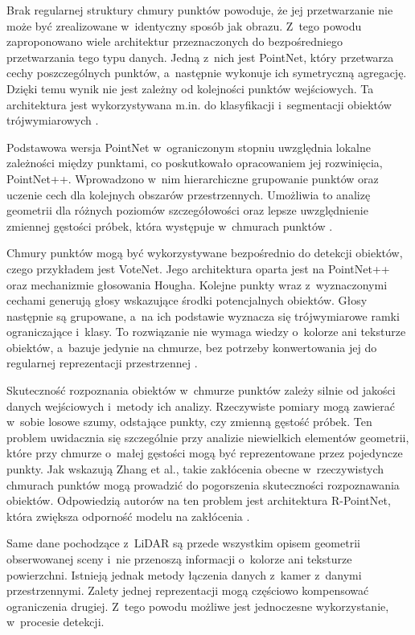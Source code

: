 Brak regularnej struktury chmury punktów powoduje, że jej przetwarzanie nie może być zrealizowane w~identyczny sposób jak obrazu. Z~tego powodu zaproponowano wiele architektur przeznaczonych do bezpośredniego przetwarzania tego typu danych. Jedną z~nich jest PointNet, który przetwarza cechy poszczególnych punktów, a~następnie wykonuje ich symetryczną agregację. Dzięki temu wynik nie jest zależny od kolejności punktów wejściowych. Ta architektura jest wykorzystywana m.in. do klasyfikacji i~segmentacji obiektów trójwymiarowych \cite{bib:qi2017pointnet}.

Podstawowa wersja PointNet w~ograniczonym stopniu uwzględnia lokalne zależności między punktami, co poskutkowało opracowaniem jej rozwinięcia, PointNet++. Wprowadzono w~nim hierarchiczne grupowanie punktów oraz uczenie cech dla kolejnych obszarów przestrzennych. Umożliwia to analizę geometrii dla różnych poziomów szczegółowości oraz lepsze uwzględnienie zmiennej gęstości próbek, która występuje w~chmurach punktów \cite{bib:qi2017pointnetplusplus}.

Chmury punktów mogą być wykorzystywane bezpośrednio do detekcji obiektów, czego przykładem jest VoteNet. Jego architektura oparta jest na PointNet++ oraz mechanizmie głosowania Hougha. Kolejne punkty wraz z~wyznaczonymi cechami generują głosy wskazujące środki potencjalnych obiektów. Głosy następnie są grupowane, a~na ich podstawie wyznacza się trójwymiarowe ramki ograniczające i~klasy. To rozwiązanie nie wymaga wiedzy o~kolorze ani teksturze obiektów, a~bazuje jedynie na chmurze, bez potrzeby konwertowania jej do regularnej reprezentacji przestrzennej \cite{bib:qi2019deep}.

Skuteczność rozpoznania obiektów w~chmurze punktów zależy silnie od jakości danych wejściowych i~metody ich analizy. Rzeczywiste pomiary mogą zawierać w~sobie losowe szumy, odstające punkty, czy zmienną gęstość próbek. Ten problem uwidacznia się szczególnie przy analizie niewielkich elementów geometrii, które przy chmurze o~małej gęstości mogą być reprezentowane przez pojedyncze punkty. Jak wskazują Zhang et al., takie zakłócenia obecne w~rzeczywistych chmurach punktów mogą prowadzić do pogorszenia skuteczności rozpoznawania obiektów. Odpowiedzią autorów na ten problem jest architektura R-PointNet, która zwiększa odporność modelu na zakłócenia \cite{bib:zhang2024rpointnet}.

Same dane pochodzące z~LiDAR są przede wszystkim opisem geometrii obserwowanej sceny i~nie przenoszą  informacji o~kolorze ani teksturze powierzchni. Istnieją jednak metody łączenia danych z~kamer z~danymi przestrzennymi. Zalety jednej reprezentacji mogą częściowo kompensować ograniczenia drugiej. Z~tego powodu możliwe jest jednoczesne wykorzystanie, w~procesie detekcji.

